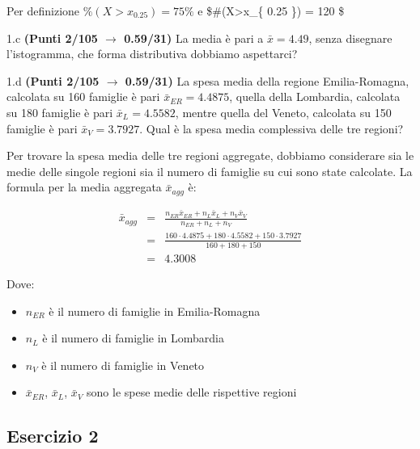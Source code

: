 \documentclass[
  11pt,
]{book}
\providecommand{\tightlist}{%
  \setlength{\itemsep}{0pt}\setlength{\parskip}{0pt}}
\theoremstyle{mytheoremstyle}
\theoremstyle{mydefstyle}
\newenvironment{sol}
  {
  \begin{tcolorbox}[enhanced,breakable,arc=0.1mm,boxrule=1pt,colback=white,colframe=iblue,
  title=\bf \fontfamily{lmss}\selectfont \hspace{.5 cm} Soluzione,drop fuzzy shadow]

}{
\end{tcolorbox}
  }
\begin{document}
\begin{sol}
Per definizione \(\%(X>x_{ 0.25 })= 75 \%\) e
\$\#(X\textgreater x\_\{ 0.25 \})  = 120 \$

\end{sol}

1.c \textbf{(Punti 2/105 \(\rightarrow\) 0.59/31)} La media è pari a \(\bar x=4.49\), senza disegnare l'istogramma, che forma distributiva dobbiamo aspettarci?

1.d \textbf{(Punti 2/105 \(\rightarrow\) 0.59/31)} La spesa media della regione Emilia-Romagna, calcolata su 160 famiglie è pari \(\bar x_{ER}=4.4875\), quella della Lombardia, calcolata su 180 famiglie è pari \(\bar x_{L}=4.5582\), mentre quella del Veneto, calcolata su 150 famiglie è pari \(\bar x_{V}=3.7927\). Qual è la spesa media complessiva delle tre regioni?

\begin{sol}

Per trovare la spesa media delle tre regioni aggregate, dobbiamo considerare sia le medie delle singole regioni sia il numero di famiglie su cui sono state calcolate. La formula per la media aggregata \(\bar{x}_{agg}\) è:

\begin{eqnarray*}
\bar{x}_{agg}    &=&  \frac{n_{ER} \bar{x}_{ER} + n_{L} \bar{x}_{L} + n_{V} \bar{x}_{V}}{n_{ER} + n_{L} + n_{V}}\\
&=& \frac{160\cdot4.4875+180\cdot4.5582+150\cdot3.7927}{160+180+150}\\
&=& 4.3008
\end{eqnarray*}

Dove:

\begin{itemize}
\tightlist
\item
  \(n_{ER}\) è il numero di famiglie in Emilia-Romagna
\item
  \(n_{L}\) è il numero di famiglie in Lombardia
\item
  \(n_{V}\) è il numero di famiglie in Veneto
\item
  \(\bar{x}_{ER}\), \(\bar{x}_{L}\), \(\bar{x}_{V}\) sono le spese medie delle rispettive regioni
\end{itemize}

\end{sol}

\subsection{Esercizio 2}\label{esercizio-2-38}
\end{document}
